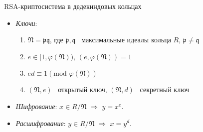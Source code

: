 \documentclass[8pt, xcolor=x11names]{beamer}
\begin{document}
\begin{frame}
    \begin{block}{RSA-криптосистема в дедекиндовых кольцах}
        \begin{itemize}
            \item \textit{Ключи}:
            \begin{enumerate}
                \item $\mathfrak{N}=\mathfrak{p} \mathfrak{q}$, где $\mathfrak{p}, \mathfrak{q}$ \textendash\ максимальные идеалы кольца $R$, $\mathfrak{p} \ne \mathfrak{q}$
    
                \item $e \in [1, \varphi(\mathfrak{N}))$, $(e, \varphi(\mathfrak{N})) = 1$
    
                \item $ed\equiv 1 (\textrm{mod } \varphi(\mathfrak{N}))$
    
                \item $(\mathfrak{N},e)$ \textendash\ открытый ключ, $(\mathfrak{N},d)$ \textendash\ секретный ключ
            \end{enumerate}
    
            \item \textit{Шифрование}: $x \in R/\mathfrak{N}$ $\Rightarrow$ $y=x^e$.
    
            \item \textit{Расшифрование}: $y \in R/\mathfrak{N}$ $\Rightarrow$ $x=y^d$.
        \end{itemize}
    \end{block}


\end{frame}
\end{document}
